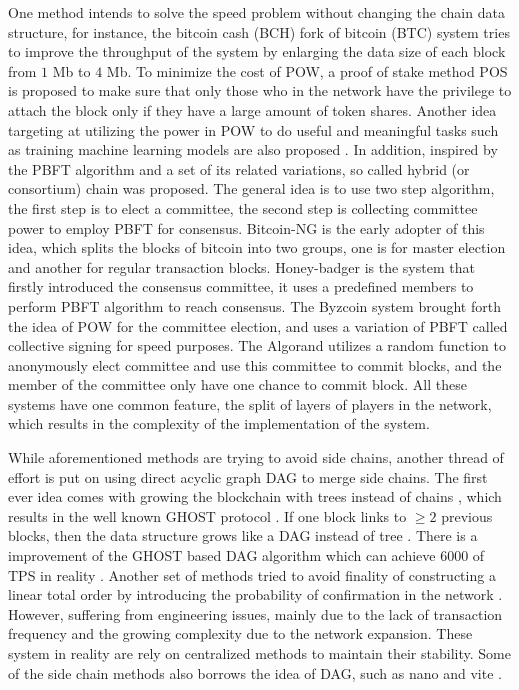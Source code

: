 One method intends to solve the speed problem without changing the chain data structure, for instance, 
the bitcoin cash (BCH) fork of bitcoin (BTC) system tries to improve the throughput of the system by enlarging the data size of each block from $1$ Mb to $4$ Mb. 
To minimize the cost of POW, a proof of stake method POS \cite{wood2014ethereum} is proposed to make sure that only those who in the network have the privilege to attach the block only if they have a large amount of token shares.
Another idea targeting at utilizing the power in POW to do useful and meaningful tasks such as training machine learning models are also proposed \cite{matthew2017aion}.
In addition, inspired by the PBFT algorithm \cite{castro1999practical} and a set of its related variations, so called hybrid (or consortium) chain was proposed. 
The general idea is to use two step algorithm, the first step is to elect a committee, the second step is collecting committee power to employ PBFT for consensus.
Bitcoin-NG \cite{eyal2016bitcoin} is the early adopter of this idea, which splits the blocks of bitcoin into two groups, one is for master election and another for regular transaction blocks. 
Honey-badger \cite{miller2016honey} is the system that firstly introduced the consensus committee, it uses a predefined members to perform PBFT algorithm to reach consensus.  
The Byzcoin system \cite{kogias2016enhancing} brought forth the idea of POW for the committee election, and uses a variation of PBFT called collective signing for speed purposes.
The Algorand \cite{gilad2017algorand} utilizes a random function to anonymously elect committee and use this committee to commit blocks, and the member of the committee only have one chance to commit block.
All these systems have one common feature, the split of layers of players in the network, which results in the complexity of the implementation of the system.

While aforementioned methods are trying to avoid side chains, another thread of effort is put on using direct acyclic graph DAG to merge side chains.
The first ever idea comes with growing the blockchain with trees instead of chains \cite{sompolinsky2013accelerating}, which results in the well known GHOST protocol \cite{sompolinsky2015secure}.
If one block links to $\geq 2$ previous blocks, then the data structure grows like a DAG instead of tree \cite{sompolinsky2016spectre, sompolinskyphantom, lewenberg2015inclusive}.
There is a improvement of the GHOST based DAG algorithm which can achieve $6000$ of TPS in reality \cite{li2018scaling}.
Another set of methods tried to avoid finality of constructing a linear total order by introducing the probability of confirmation in the network \cite{popov2016tangle, churyumov2016byteball}. 
However, suffering from engineering issues, mainly due to the lack of transaction frequency and the growing complexity due to the network expansion.
These system in reality are rely on centralized methods to maintain their stability.
Some of the side chain methods also borrows the idea of DAG, such as nano \cite{lemahieu2018nano} and vite \cite{liuvite}.


